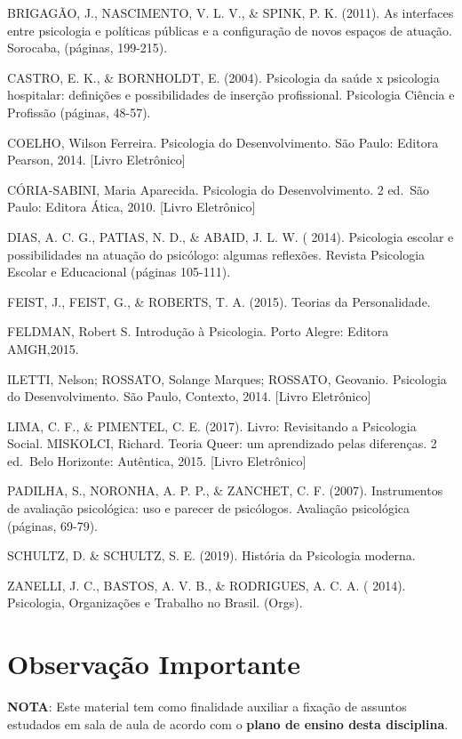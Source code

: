 \documentclass[
]{book}
\begin{document}
BRIGAGÃO, J., NASCIMENTO, V. L. V., \& SPINK, P. K. (2011). As
interfaces entre psicologia e políticas públicas e a configuração de
novos espaços de atuação. Sorocaba, (páginas, 199-215).

CASTRO, E. K., \& BORNHOLDT, E. (2004). Psicologia da saúde x psicologia
hospitalar: definições e possibilidades de inserção profissional.
Psicologia Ciência e Profissão (páginas, 48-57).

COELHO, Wilson Ferreira. Psicologia do Desenvolvimento. São Paulo:
Editora Pearson, 2014. {[}Livro Eletrônico{]}

CÓRIA-SABINI, Maria Aparecida. Psicologia do Desenvolvimento. 2 ed.~São
Paulo: Editora Ática, 2010. {[}Livro Eletrônico{]}

DIAS, A. C. G., PATIAS, N. D., \& ABAID, J. L. W. ( 2014). Psicologia
escolar e possibilidades na atuação do psicólogo: algumas reflexões.
Revista Psicologia Escolar e Educacional (páginas 105-111).

FEIST, J., FEIST, G., \& ROBERTS, T. A. (2015). Teorias da
Personalidade.

FELDMAN, Robert S. Introdução à Psicologia. Porto Alegre: Editora
AMGH,2015.

ILETTI, Nelson; ROSSATO, Solange Marques; ROSSATO, Geovanio. Psicologia
do Desenvolvimento. São Paulo, Contexto, 2014. {[}Livro Eletrônico{]}

LIMA, C. F., \& PIMENTEL, C. E. (2017). Livro: Revisitando a Psicologia
Social. MISKOLCI, Richard. Teoria Queer: um aprendizado pelas
diferenças. 2 ed.~Belo Horizonte: Autêntica, 2015. {[}Livro
Eletrônico{]}

PADILHA, S., NORONHA, A. P. P., \& ZANCHET, C. F. (2007). Instrumentos
de avaliação psicológica: uso e parecer de psicólogos. Avaliação
psicológica (páginas, 69-79).

SCHULTZ, D. \& SCHULTZ, S. E. (2019). História da Psicologia moderna.

ZANELLI, J. C., BASTOS, A. V. B., \& RODRIGUES, A. C. A. ( 2014).
Psicologia, Organizações e Trabalho no Brasil. (Orgs).

\hypertarget{observauxe7uxe3o-importante}{%
\section{Observação Importante}\label{observauxe7uxe3o-importante}}

\textbf{NOTA}: Este material tem como finalidade auxiliar a fixação de
assuntos estudados em sala de aula de acordo com o \textbf{plano de
ensino desta disciplina}.
\end{document}
